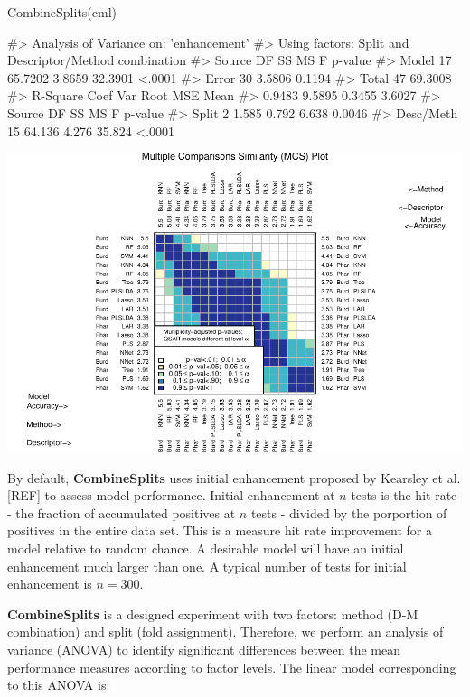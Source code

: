 \begin{Schunk}
\begin{Sinput}
CombineSplits(cml)
\end{Sinput}
\begin{Soutput}
#>    Analysis of Variance on: 'enhancement'
#>  Using factors: Split and Descriptor/Method combination
#> Source    DF        SS        MS         F   p-value   
#> Model     17   65.7202    3.8659   32.3901    <.0001   
#> Error     30    3.5806    0.1194   
#> Total     47   69.3008   
#>       R-Square   Coef Var   Root MSE       Mean   
#>         0.9483     9.5895     0.3455     3.6027   
#> Source       DF       SS       MS        F   p-value   
#> Split         2    1.585    0.792    6.638    0.0046   
#> Desc/Meth    15   64.136    4.276   35.824    <.0001
\end{Soutput}

\includegraphics{chemmodlabRJournal_files/figure-latex/CombineSplits_ie-1} \end{Schunk}

By default, \textbf{CombineSplits} uses initial enhancement proposed by
Kearsley et al. {[}REF{]} to assess model performance. Initial
enhancement at \(n\) tests is the hit rate - the fraction of accumulated
positives at \(n\) tests - divided by the porportion of positives in the
entire data set. This is a measure hit rate improvement for a model
relative to random chance. A desirable model will have an initial
enhancement much larger than one. A typical number of tests for initial
enhancement is \(n=300\).

\textbf{CombineSplits} is a designed experiment with two factors: method
(D-M combination) and split (fold assignment). Therefore, we perform an
analysis of variance (ANOVA) to identify significant differences between
the mean performance measures according to factor levels. The linear
model corresponding to this ANOVA is:

